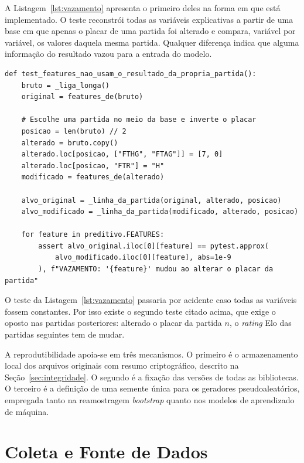 A Listagem~\ref{lst:vazamento} apresenta o primeiro deles na forma em que está
implementado. O teste reconstrói todas as variáveis explicativas a partir de uma
base em que apenas o placar de uma partida foi alterado e compara, variável por
variável, os valores daquela mesma partida. Qualquer diferença indica que alguma
informação do resultado vazou para a entrada do modelo.

\begin{sourcecode}[htb]
  \caption{Teste de ausência de vazamento, em
    \texttt{tests/test\_preditivo.py}.}
  \label{lst:vazamento}
\begin{lstlisting}
def test_features_nao_usam_o_resultado_da_propria_partida():
    bruto = _liga_longa()
    original = features_de(bruto)

    # Escolhe uma partida no meio da base e inverte o placar
    posicao = len(bruto) // 2
    alterado = bruto.copy()
    alterado.loc[posicao, ["FTHG", "FTAG"]] = [7, 0]
    alterado.loc[posicao, "FTR"] = "H"
    modificado = features_de(alterado)

    alvo_original = _linha_da_partida(original, alterado, posicao)
    alvo_modificado = _linha_da_partida(modificado, alterado, posicao)

    for feature in preditivo.FEATURES:
        assert alvo_original.iloc[0][feature] == pytest.approx(
            alvo_modificado.iloc[0][feature], abs=1e-9
        ), f"VAZAMENTO: '{feature}' mudou ao alterar o placar da partida"
\end{lstlisting}
\end{sourcecode}

O teste da Listagem~\ref{lst:vazamento} passaria por acidente caso todas as
variáveis fossem constantes. Por isso existe o segundo teste citado acima, que
exige o oposto nas partidas posteriores: alterado o placar da partida $n$, o
\textit{rating} Elo das partidas seguintes tem de mudar.

A reprodutibilidade apoia-se em três mecanismos. O primeiro é o armazenamento
local dos arquivos originais com resumo criptográfico, descrito na
Seção~\ref{sec:integridade}. O segundo é a fixação das versões de todas as
bibliotecas. O terceiro é a definição de uma semente única para os geradores
pseudoaleatórios, empregada tanto na reamostragem \textit{bootstrap} quanto nos
modelos de aprendizado de máquina.

\section{Coleta e Fonte de Dados}\label{sec:coleta}

